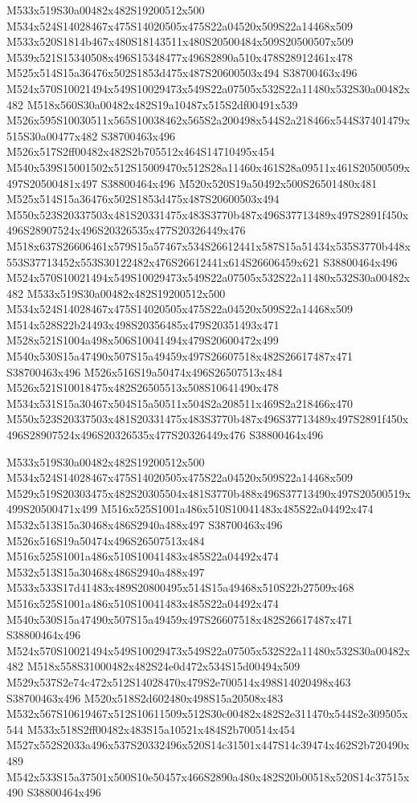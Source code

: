 \documentclass{article}
\begin{document}
\begin{multicols}{2}
M533x519S30a00482x482S19200512x500 M534x524S14028467x475S14020505x475S22a04520x509S22a14468x509 M533x520S1814b467x480S18143511x480S20500484x509S20500507x509 M539x521S15340508x496S15348477x496S2890a510x478S28912461x478 M525x514S15a36476x502S1853d475x487S20600503x494 S38700463x496 M524x570S10021494x549S10029473x549S22a07505x532S22a11480x532S30a00482x482 M518x560S30a00482x482S19a10487x515S2df00491x539 M526x595S10030511x565S10038462x565S2a200498x544S2a218466x544S37401479x515S30a00477x482 S38700463x496 M526x517S2ff00482x482S2b705512x464S14710495x454 M540x539S15001502x512S15009470x512S28a11460x461S28a09511x461S20500509x497S20500481x497 S38800464x496 M520x520S19a50492x500S26501480x481 M525x514S15a36476x502S1853d475x487S20600503x494 M550x523S20337503x481S20331475x483S3770b487x496S37713489x497S2891f450x496S28907524x496S20326535x477S20326449x476 M518x637S26606461x579S15a57467x534S26612441x587S15a51434x535S3770b448x553S37713452x553S30122482x476S26612441x614S26606459x621 S38800464x496 M524x570S10021494x549S10029473x549S22a07505x532S22a11480x532S30a00482x482 M533x519S30a00482x482S19200512x500 M534x524S14028467x475S14020505x475S22a04520x509S22a14468x509 M514x528S22b24493x498S20356485x479S20351493x471 M528x521S1004a498x506S10041494x479S20600472x499 M540x530S15a47490x507S15a49459x497S26607518x482S26617487x471 S38700463x496 M526x516S19a50474x496S26507513x484 M526x521S10018475x482S26505513x508S10641490x478 M534x531S15a30467x504S15a50511x504S2a208511x469S2a218466x470 M550x523S20337503x481S20331475x483S3770b487x496S37713489x497S2891f450x496S28907524x496S20326535x477S20326449x476 S38800464x496

M533x519S30a00482x482S19200512x500 M534x524S14028467x475S14020505x475S22a04520x509S22a14468x509 M529x519S20303475x482S20305504x481S3770b488x496S37713490x497S20500519x499S20500471x499 M516x525S1001a486x510S10041483x485S22a04492x474 M532x513S15a30468x486S2940a488x497 S38700463x496 M526x516S19a50474x496S26507513x484 M516x525S1001a486x510S10041483x485S22a04492x474 M532x513S15a30468x486S2940a488x497 M533x533S17d41483x489S20800495x514S15a49468x510S22b27509x468 M516x525S1001a486x510S10041483x485S22a04492x474 M540x530S15a47490x507S15a49459x497S26607518x482S26617487x471 S38800464x496 M524x570S10021494x549S10029473x549S22a07505x532S22a11480x532S30a00482x482 M518x558S31000482x482S24e0d472x534S15d00494x509 M529x537S2e74c472x512S14028470x479S2e700514x498S14020498x463 S38700463x496 M520x518S2d602480x498S15a20508x483 M532x567S10619467x512S10611509x512S30c00482x482S2e311470x544S2e309505x544 M533x518S2ff00482x483S15a10521x484S2b700514x454 M527x552S2033a496x537S20332496x520S14c31501x447S14c39474x462S2b720490x489 M542x533S15a37501x500S10e50457x466S2890a480x482S20b00518x520S14c37515x490 S38800464x496


\end{multicols}
\end{document}
